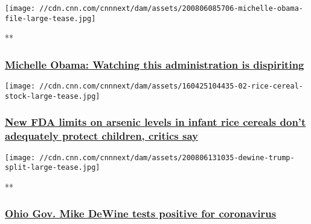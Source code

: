 \href{/videos/health/2020/08/06/michelle-obama-low-grade-depression-trump-nr-vpx.cnn}{}

\texttt{[image: //cdn.cnn.com/cnnnext/dam/assets/200806085706-michelle-obama-file-large-tease.jpg]}

**

\hypertarget{michelle-obama-watching-this-administration-is-dispiriting}{%
\subsubsection{\texorpdfstring{\href{/videos/health/2020/08/06/michelle-obama-low-grade-depression-trump-nr-vpx.cnn}{Michelle
Obama: Watching this administration is
dispiriting}}{Michelle Obama: Watching this administration is dispiriting}}\label{michelle-obama-watching-this-administration-is-dispiriting}}

\href{/2020/08/06/health/arsenic-infant-rice-cereal-fda-wellness/index.html}{}

\texttt{[image: //cdn.cnn.com/cnnnext/dam/assets/160425104435-02-rice-cereal-stock-large-tease.jpg]}

\hypertarget{new-fda-limits-on-arsenic-levels-in-infant-rice-cereals-dont-adequately-protect-children-critics-say-1}{%
\subsubsection{\texorpdfstring{\href{/2020/08/06/health/arsenic-infant-rice-cereal-fda-wellness/index.html}{New
FDA limits on arsenic levels in infant rice cereals don't adequately
protect children, critics
say}}{New FDA limits on arsenic levels in infant rice cereals don't adequately protect children, critics say}}\label{new-fda-limits-on-arsenic-levels-in-infant-rice-cereals-dont-adequately-protect-children-critics-say-1}}

\href{/videos/health/2020/08/06/ohio-governor-mike-dewine-positive-coronavirus-cohen-vpx.cnn}{}

\texttt{[image: //cdn.cnn.com/cnnnext/dam/assets/200806131035-dewine-trump-split-large-tease.jpg]}

**

\hypertarget{ohio-gov-mike-dewine-tests-positive-for-coronavirus}{%
\subsubsection{\texorpdfstring{\href{/videos/health/2020/08/06/ohio-governor-mike-dewine-positive-coronavirus-cohen-vpx.cnn}{Ohio
Gov. Mike DeWine tests positive for
coronavirus}}{Ohio Gov. Mike DeWine tests positive for coronavirus}}\label{ohio-gov-mike-dewine-tests-positive-for-coronavirus}}

